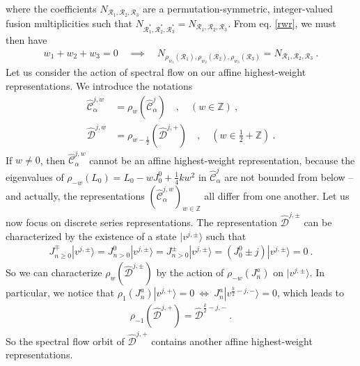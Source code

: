 \documentclass[12pt, a4paper, notitlepage, twoside]{report}
\numberwithin{equation}{section}
\theoremstyle{break}
\begin{document}
where the coefficients $N_{\mathcal{R}_1,\mathcal{R}_2,\mathcal{R}_3}$ are a permutation-symmetric, integer-valued fusion multiplicities such that $N_{\mathcal{R}_1^*,\mathcal{R}_2^*,\mathcal{R}_3^*}=N_{\mathcal{R}_1,\mathcal{R}_2,\mathcal{R}_3}$.
From eq. \eqref{rwr}, we must then have 
\begin{align}
w_1+w_2+w_3=0 \quad \implies \quad N_{\rho_{w_1}(\mathcal{R}_1),\rho_{w_2}(\mathcal{R}_2),\rho_{w_3}(\mathcal{R}_3)}=N_{\mathcal{R}_1,\mathcal{R}_2,\mathcal{R}_3}\ .
\label{nrrr} 
\end{align}
Let us consider the action of spectral flow on our affine highest-weight representations. 
We introduce the notations 
\begin{align}
 \hat{\mathcal{C}}^{j,w}_\alpha &= \rho_w(\hat{\mathcal{C}}^j_\alpha) \quad , \quad (w\in{\mathbb{Z}})\ ,
\\
\hat{\mathcal{D}}^{j,w} &= \rho_{w-\frac12}(\hat{\mathcal{D}}^{j,+})\quad , \quad (w\in \tfrac12+{\mathbb{Z}})\ .
\end{align}
If $w\neq 0$, then $\hat{\mathcal{C}}^{j,w}_\alpha$ cannot be an affine highest-weight representation, because the eigenvalues of $\rho_{-w}(L_0) = L_0-w J^0_0 +\frac14 kw^2$ in $\hat{\mathcal{C}}^j_\alpha$ are not bounded from below -- and actually, the representations $(\hat{\mathcal{C}}^{j,w}_\alpha)_{w\in{\mathbb{Z}}}$ all differ from one another.
Let us now focus on discrete series representations.
The representation $\hat{\mathcal{D}}^{j,\pm}$ can be characterized by the existence of a state $|v^{j,\pm}\rangle$ such that 
\begin{align}
J^\mp_{n\geq 0}|v^{j,\pm}\rangle = J^0_{n>0}|v^{j,\pm}\rangle =  J^\pm_{n>0}|v^{j,\pm}\rangle = (J^0_0\pm j)|v^{j,\pm}\rangle = 0\ .
\end{align}
So we can characterize $\rho_w(\hat{\mathcal{D}}^{j,\pm})$ by the action of $\rho_{-w}(J^a_n)$ on $|v^{j,\pm}\rangle$.
In particular, we notice that $\rho_1(J^a_n)|v^{j,+}\rangle = 0 \ \iff \ J^a_n|v^{\frac{k}{2}-j,-}\rangle=0$, which leads to 
\begin{align}
 \rho_{-1}(\hat{\mathcal{D}}^{j,+}) = \hat{\mathcal{D}}^{\frac{k}{2}-j,-} \ .
\label{rdd}
\end{align}
So the spectral flow orbit of $\hat{\mathcal{D}}^{j,+}$ contains another affine highest-weight representations.
\end{document}
